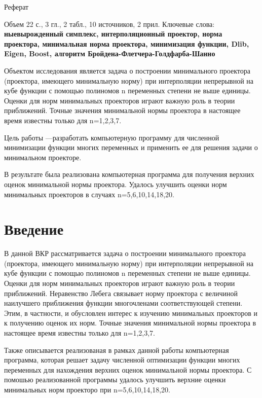 \documentclass[12pt, a4paper]{extarticle}
\begin{document}
 
\justify 
\setlength{\parindent}{1.25cm} 
\newpage 
\thispagestyle{empty} 
\setcounter{page}{2} 
\begin{center}
Реферат
\end{center}

Объем 22 с., 3 гл., 2 табл., 10 источников, 2 прил.\newline
Ключевые слова: {\bf ныевырожденный симплекс, интерполяционный проектор, норма проектора, минимальная норма проектора, минимизация функции, Dlib, Eigen, Boost, алгоритм Бройдена-Флетчера-Голдфарба-Шанно}

Объектом исследования является задача о построении минимального проектора (проектора, имеющего минимальную норму) при интерполяции непрерывной на кубе функции с помощью полиномов n переменных степени не выше единицы. Оценки для норм минимальных проекторов играют важную роль в теории приближений.  Точные значения минимальной нормы проектора в настоящее время известны только для n=1,2,3,7.

Цель работы ---разработать компьютерную программу для численной минимизации функции многих переменных и применить ее для решения задачи о минимальном проекторе.

В результате была реализована компьютерная программа для получения верхних оценок минимальной нормы проектора. Удалось улучшить оценки норм минимальных проекторов в случаях n=5,6,10,14,18,20.

\newpage 
\tableofcontents 
\newpage 
\section*{Введение} 

В данной ВКР рассматривается задача о построении минимального проектора (проектора, имеющего минимальную норму) при интерполяции непрерывной на кубе функции с помощью полиномов n переменных степени не выше единицы. Оценки для норм минимальных проекторов играют важную роль в теории приближений. Неравенство Лебега связывает норму проектора с величиной наилучшего приближения функции многочленами соответствующей степени. Этим, в частности, и обусловлен интерес к изучению минимальных проекторов и к получению оценок их норм. Точные значения минимальной нормы проектора в настоящее время известны только для n=1,2,3,7.

Также описывается реализованая в рамках данной работы компьютерная программа, которая решает задачу численной оптимизации функции многих переменных для нахождения верхних оценок минимальной нормы проектора. С помошью реализованной программы удалось улучшить верхние оценки минимальных норм проекторо при n=5,6,10,14,18,20.
\end{document}
